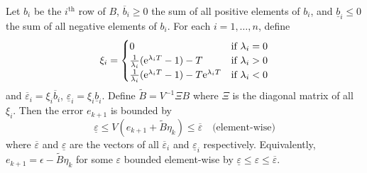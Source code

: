 \begin{theorem}
  \label{thm:averaged-sys-bound}
  Let $b_i$ be the $i^{\text{th}}$ row of $B$, $\overbar{b}_i \geqslant 0$ the sum of all positive elements of $b_i$, and $\underline{b}_i \leqslant 0$ the sum of all negative elements of $b_i$.
  For each $i = 1,\ldots,n$, define
  \[ \xi_i =
  \begin{cases}
    0 & \text{if $\lambda_{i} = 0$} \\
    \frac{1}{\lambda_i} (\mathrm{e}^{\lambda_i T} - 1) - T & \text{if $\lambda_i > 0$}\\
    \frac{1}{\lambda_i} (\mathrm{e}^{\lambda_i T} - 1) - T \mathrm{e}^{\lambda_i T} & \text{if $\lambda_i < 0$}
  \end{cases} \]
  and $\overbar{\varepsilon}_{i} = \xi_{i} \overbar{b}_{i}$, $\underline{\varepsilon}_{i} = \xi_{i} \underline{b}_{i}$.
  Define $\tilde{B} = V^{-1} \Xi B$ where $\Xi$ is the diagonal matrix of all $\xi_{i}$.
  Then the error $e_{k+1}$ is bounded by
  \begin{equation*}
    \underline{\varepsilon} \leqslant V (e_{k+1} + \tilde{B} \eta_{k}) \leqslant \overbar{\varepsilon} \quad \text{(element-wise)}
  \end{equation*}
  where $\overbar{\varepsilon}$ and $\underline{\varepsilon}$ are the vectors of all $\overbar{\varepsilon}_{i}$ and $\underline{\varepsilon}_{i}$ respectively.
  Equivalently, $e_{k+1} = \epsilon - \tilde{B} \eta_{k}$ for some $\varepsilon$ bounded element-wise by $\underline{\varepsilon} \leqslant \varepsilon \leqslant \overbar{\varepsilon}$.
\end{theorem}



